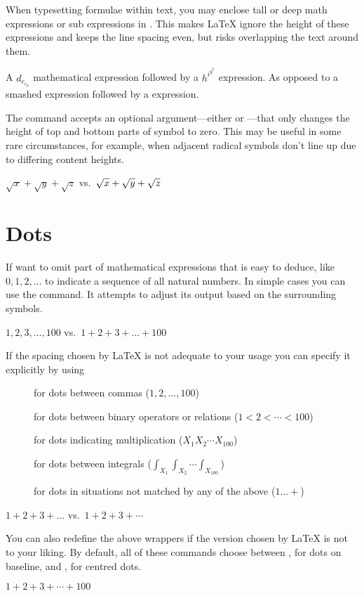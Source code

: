When typesetting formulae within text, you may enclose tall or deep math
expressions or sub expressions in . This makes \LaTeX{} ignore the
height of these expressions and keeps the line spacing even, but risks
overlapping the text around them.
\begin{example}
A \(d_{e_{e_p}}\) mathematical
expression followed by a
\(h^{i^{g^h}}\) expression.
As opposed to a smashed 
expression followed by a
expression.
\end{example}

The  command accepts an optional argument---either  or
---that only changes the height of top and bottom parts of symbol to
zero. This may be useful in some rare circumstances, for example, when adjacent
radical symbols don't line up due to differing content heights.
\begin{example}
\(  \sqrt{x} 
  + \sqrt{y} 
  + \sqrt{z}\)
vs.\
\(  \sqrt{x} 
  + \sqrt{\smash[b]{y}} 
  + \sqrt{z} \)
\end{example}

\section{Dots}

If want to omit part of mathematical expressions
that is easy to deduce, like \(0, 1, 2, \dots\) to indicate
a sequence of all natural numbers. In simple cases you can use the
\csi{dots} command. It attempts to adjust its output based on the surrounding
symbols.
\begin{example}
\(1, 2, 3, \dots, 100\) vs.\
\(1 + 2 + 3 + \dots + 100\)
\end{example}

If the spacing chosen by \LaTeX{} is not adequate to your usage you can specify
it explicitly by using
\begin{description}
  \item[] for dots between commas (\(1, 2, \dotsc, 100\))
  \item[\csi{dotsb}] for dots between binary operators or relations (\(1 < 2 <
    \dotsb < 100\))
  \item[\csi{dotsm}] for dots indicating multiplication (\(X_1 X_2 \dotsm
    X_{100}\))
  \item[\csi{dotsi}] for dots between integrals (\(\int_{X_1}\int_{X_2}
    \dotsi \int_{X_{100}}\))
  \item[\csi{dotso}] for dots in situations not matched by any of the above
    (\(1\dotso+\))
\end{description}
\begin{example}
\(1 + 2 + 3 + \dots\) vs.\ 
\(1 + 2 + 3 + \dotsb\) 
\end{example}
You can also redefine the above wrappers if the version chosen by \LaTeX{} is
not to your liking. By default, all of these commands choose between
\csi{ldots}, for dots on baseline, and , for centred dots.
\begin{example}
\RenewDocumentCommand{%
  \dotsb}{}{\ldots}
\( 1 + 2 + 3 + \dotsb + 100 \)
\end{example}

